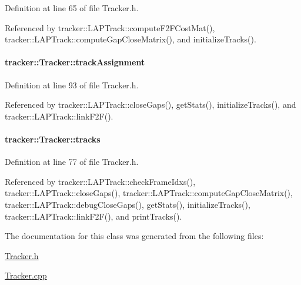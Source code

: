 Definition at line 65 of file Tracker.\+h.



Referenced by tracker\+::\+L\+A\+P\+Track\+::compute\+F2\+F\+Cost\+Mat(), tracker\+::\+L\+A\+P\+Track\+::compute\+Gap\+Close\+Matrix(), and initialize\+Tracks().

\paragraph[{\texorpdfstring{track\+Assignment}{trackAssignment}}]{ tracker\+::\+Tracker\+::track\+Assignment\hspace{0.3cm}{\ttfamily [protected]}}\hypertarget{classtracker_1_1Tracker_a638ecbd5a6466c2730e7c7b9561e9fc9}{}\label{classtracker_1_1Tracker_a638ecbd5a6466c2730e7c7b9561e9fc9}


Definition at line 93 of file Tracker.\+h.



Referenced by tracker\+::\+L\+A\+P\+Track\+::close\+Gaps(), get\+Stats(), initialize\+Tracks(), and tracker\+::\+L\+A\+P\+Track\+::link\+F2\+F().

\paragraph[{\texorpdfstring{tracks}{tracks}}]{ tracker\+::\+Tracker\+::tracks}\hypertarget{classtracker_1_1Tracker_a1e43335eb50e56014399a157b261160b}{}\label{classtracker_1_1Tracker_a1e43335eb50e56014399a157b261160b}


Definition at line 77 of file Tracker.\+h.



Referenced by tracker\+::\+L\+A\+P\+Track\+::check\+Frame\+Idxs(), tracker\+::\+L\+A\+P\+Track\+::close\+Gaps(), tracker\+::\+L\+A\+P\+Track\+::compute\+Gap\+Close\+Matrix(), tracker\+::\+L\+A\+P\+Track\+::debug\+Close\+Gaps(), get\+Stats(), initialize\+Tracks(), tracker\+::\+L\+A\+P\+Track\+::link\+F2\+F(), and print\+Tracks().



The documentation for this class was generated from the following files\+:\begin{DoxyCompactItemize}
\item 
\hyperlink{Tracker_8h}{Tracker.\+h}\item 
\hyperlink{Tracker_8cpp}{Tracker.\+cpp}\end{DoxyCompactItemize}
